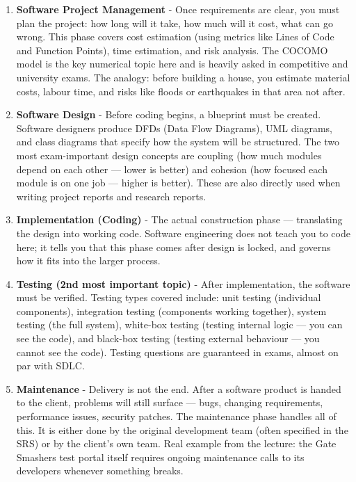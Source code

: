 \documentclass{report}
\begin{document}
\begin{enumerate}
    \item \textbf{Software Project Management} - Once requirements are clear, you must plan the project: how long will it take, how much will it cost, what can go wrong. This phase covers cost estimation (using metrics like Lines of Code and Function Points), time estimation, and risk analysis. The COCOMO model is the key numerical topic here and is heavily asked in competitive and university exams. The analogy: before building a house, you estimate material costs, labour time, and risks like floods or earthquakes in that area not after.

    \item \textbf{Software Design} - Before coding begins, a blueprint must be created. Software designers produce DFDs (Data Flow Diagrams), UML diagrams, and class diagrams that specify how the system will be structured. The two most exam-important design concepts are coupling (how much modules depend on each other — lower is better) and cohesion (how focused each module is on one job — higher is better). These are also directly used when writing project reports and research reports.
    \item \textbf{Implementation (Coding)} - The actual construction phase — translating the design into working code. Software engineering does not teach you to code here; it tells you that this phase comes after design is locked, and governs how it fits into the larger process.

    \item \textbf{Testing (2nd most important topic)} - After implementation, the software must be verified. Testing types covered include: unit testing (individual components), integration testing (components working together), system testing (the full system), white-box testing (testing internal logic — you can see the code), and black-box testing (testing external behaviour — you cannot see the code). Testing questions are guaranteed in exams, almost on par with SDLC.
    \item \textbf{Maintenance} - Delivery is not the end. After a software product is handed to the client, problems will still surface — bugs, changing requirements, performance issues, security patches. The maintenance phase handles all of this. It is either done by the original development team (often specified in the SRS) or by the client's own team. Real example from the lecture: the Gate Smashers test portal itself requires ongoing maintenance calls to its developers whenever something breaks.


\end{enumerate}
\end{document}
